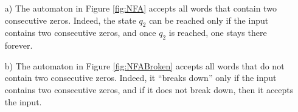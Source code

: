 

\setcounter{section}{1}
\setcounter{subsection}{3}
\setcounter{dfn}{6}

\begin{exl}
\label{exl:NFA}
\par\noindent
\begin{enumerate}
\item[a)]
The automaton in Figure \ref{fig:NFA} accepts all words that contain two consecutive zeros.
Indeed, the state $q_2$ can be reached only if the input contains two consecutive zeros,
and once $q_2$ is reached, one stays there forever.
\item[b)]
The automaton in Figure \ref{fig:NFABroken} accepts all words that do not contain two consecutive zeros.
Indeed, it ``breaks down'' only if the input contains two consecutive zeros, and if it does not break down, then it accepts the input.
\end{enumerate}
\end{exl}



